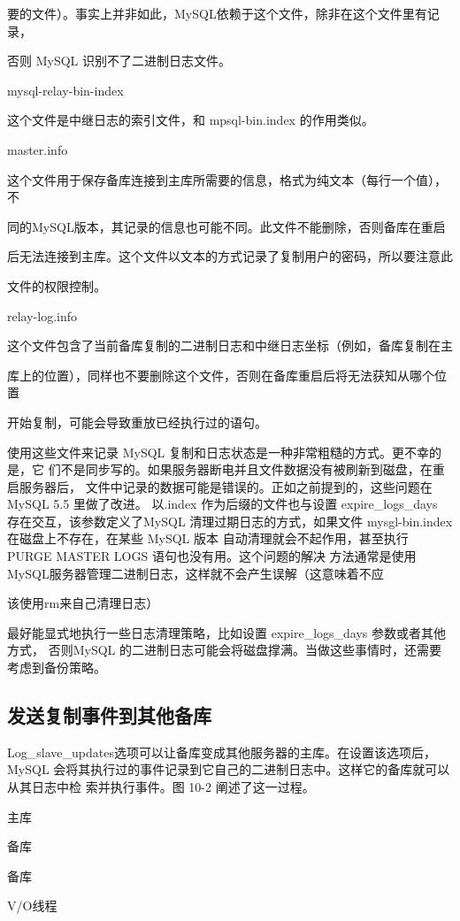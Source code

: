 要的文件）。事实上并非如此，MySQL依赖于这个文件，除非在这个文件里有记录，

否则 MySQL 识别不了二进制日志文件。

mysql-relay-bin-index

这个文件是中继日志的索引文件，和 mpsql-bin.index 的作用类似。

master.info

这个文件用于保存备库连接到主库所需要的信息，格式为纯文本（每行一个值），不

同的MySQL版本，其记录的信息也可能不同。此文件不能删除，否则备库在重启

后无法连接到主库。这个文件以文本的方式记录了复制用户的密码，所以要注意此

文件的权限控制。

relay-log.info

这个文件包含了当前备库复制的二进制日志和中继日志坐标（例如，备库复制在主

库上的位置），同样也不要删除这个文件，否则在备库重启后将无法获知从哪个位置

开始复制，可能会导致重放已经执行过的语句。

使用这些文件来记录 MySQL 复制和日志状态是一种非常粗糙的方式。更不幸的是，它
们不是同步写的。如果服务器断电并且文件数据没有被刷新到磁盘，在重启服务器后，
文件中记录的数据可能是错误的。正如之前提到的，这些问题在 MySQL 5.5 里做了改进。
以.index 作为后缀的文件也与设置 expire\_logs\_days 存在交互，该参数定义了MySQL
清理过期日志的方式，如果文件 mysgl-bin.index 在磁盘上不存在，在某些 MySQL 版本
自动清理就会不起作用，甚至执行 PURGE MASTER LOGS 语句也没有用。这个问题的解决
方法通常是使用MySQL服务器管理二进制日志，这样就不会产生误解（这意味着不应

该使用rm来自己清理日志）

最好能显式地执行一些日志清理策略，比如设置 expire\_logs\_days 参数或者其他方式，
否则MySQL 的二进制日志可能会将磁盘撑满。当做这些事情时，还需要考虑到备份策略。
\subsection{发送复制事件到其他备库}
Log\_slave\_updates选项可以让备库变成其他服务器的主库。在设置该选项后，MySQL
会将其执行过的事件记录到它自己的二进制日志中。这样它的备库就可以从其日志中检
索并执行事件。图 10-2 阐述了这一过程。

主库

备库

备库

V/O线程

